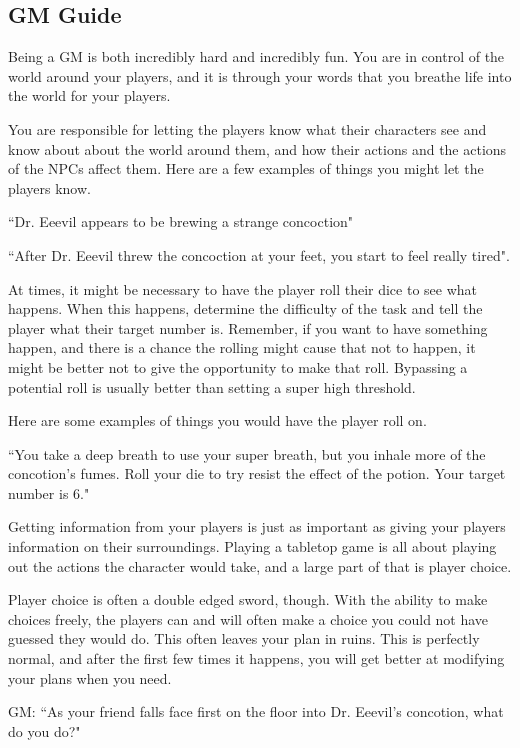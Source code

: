 \begin{flushleft}

\chapter{GM Guide}

Being a GM is both incredibly hard and incredibly fun. You are in control of
the world around your players, and it is through your words that you breathe
life into the world for your players.

You are responsible for letting the players know what their characters see and
know about about the world around them, and how their actions and the actions
of the NPCs affect them. Here are a few examples of things you might let the
players know.

``Dr. Eeevil appears to be brewing a strange concoction"

``After Dr. Eeevil threw the concoction at your feet, you start to feel really
tired".

At times, it might be necessary to have the player roll their dice to see what
happens. When this happens, determine the difficulty of the task and tell the
player what their target number is. Remember, if you want to have something
happen, and there is a chance the rolling might cause that not to happen,
it might be better not to give the opportunity to make that roll. Bypassing
a potential roll is usually better than setting a super high threshold.

Here are some examples of things you would have the player roll on.

``You take a deep breath to use your super breath, but you inhale more of the
concotion's fumes. Roll your die to try resist the effect of the potion. Your
target number is 6."

Getting information from your players is just as important as giving your
players information on their surroundings. Playing a tabletop game is all
about playing out the actions the character would take, and a large part of
that is player choice.

Player choice is often a double edged sword, though. With the ability to make
choices freely, the players can and will often make a choice you could not have
guessed they would do. This often leaves your plan in ruins. This is perfectly
normal, and after the first few times it happens, you will get better at
modifying your plans when you need.

GM: ``As your friend falls face first on the floor into Dr. Eeevil's
concotion, what do you do?"


\end{flushleft}
